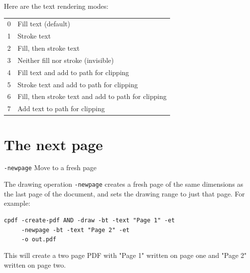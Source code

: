 \documentclass{book}
\begin{document}
\noindent Here are the text rendering modes:

\bigskip
\begin{tabular}{ll}
0 & Fill text (default)\\
1 & Stroke text\\
2 & Fill, then stroke text\\
3 & Neither fill nor stroke (invisible)\\
4 & Fill text and add to path for clipping\\
5 & Stroke text and add to path for clipping\\
6 & Fill, then stroke text and add to path for clipping\\
7 & Add text to path for clipping
\end{tabular}
\bigskip

\section{The next page}

  {\small\begin{framed}
   \vspace{1.5mm}
   \noindent\verb!-newpage! Move to a fresh page
  \end{framed}}

The drawing operation \texttt{-newpage} creates a fresh page of the same dimensions as the last page of the document, and sets the drawing range to just that page. For example:

\begin{framed}
 \noindent\small\verb?cpdf -create-pdf AND -draw -bt -text "Page 1" -et?\\
 \noindent\small\verb?     -newpage -bt -text "Page 2" -et?\\
 \noindent\small\verb?     -o out.pdf?
\end{framed}

\noindent This will create a two page PDF with "Page 1" written on page one and "Page 2" written on page two.


\clearpage\pagestyle{empty}
\end{document}
